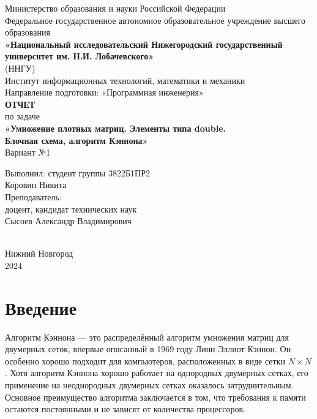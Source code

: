 \documentclass[12pt]{article}
\begin{document}
\begin{titlepage}
    \centering
    \large
    Министерство образования и науки Российской Федерации\\
    Федеральное государственное автономное образовательное учреждение высшего образования\\
    \textbf{«Национальный исследовательский Нижегородский государственный университет им. Н.И. Лобачевского»}\\
    (ННГУ)\\[1cm]
    Институт информационных технологий, математики и механики\\
    Направление подготовки: «Программная инженерия»\\[2cm]
    
    {\Large \textbf{ОТЧЕТ}}\\[0.5cm]
    {\Large по задаче}\\[0.5cm]
    {\Large \textbf{«Умножение плотных матриц. Элементы типа double.\\ Блочная схема, алгоритм Кэннона»}}\\[0.5cm]
    {\Large Вариант №1}\\[4cm]
    
    \hfill\parbox{0.5\textwidth}{
        Выполнил: студент группы 3822Б1ПР2\\
        Коровин Никита\\[1.5em]
        Преподаватель:\\
        доцент, кандидат технических наук\\
        Сысоев Александр Владимирович
    }\\[3cm]
    
    \vspace*{\fill}
    Нижний Новгород\\
    2024
\end{titlepage}

\thispagestyle{empty}
\clearpage
{} 
\setcounter{page}{2} 
\tableofcontents
\clearpage
\setcounter{page}{3} 
\section{Введение}

\hspace*{1.25em}Алгоритм Кэннона — это распределённый алгоритм умножения матриц для двумерных сеток, впервые описанный в 1969 году Линн Эллиот Кэннон. Он особенно хорошо подходит для компьютеров, расположенных в виде сетки $N \times N$. Хотя алгоритм Кэннона хорошо работает на однородных двумерных сетках, его применение на неоднородных двумерных сетках оказалось затруднительным. Основное преимущество алгоритма заключается в том, что требования к памяти остаются постоянными и не зависят от количества процессоров.
\end{document}
